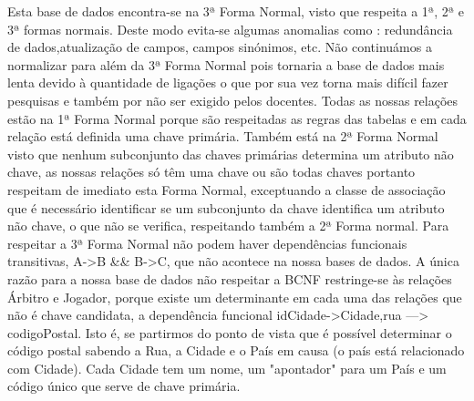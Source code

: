 \documentclass[a4paper]{article}
\begin{document}
Esta base de dados encontra-se na 3ª Forma Normal, visto que respeita a 1ª, 2ª e 3ª formas normais. Deste modo evita-se algumas anomalias como : redundância de dados,atualização de campos, campos sinónimos, etc. Não continuámos a normalizar para além da 3ª Forma Normal pois tornaria a base de dados mais lenta devido à quantidade de ligações o que por sua vez torna mais difícil fazer pesquisas e também por não ser exigido pelos docentes. Todas as nossas relações estão na 1ª Forma Normal porque são respeitadas as regras das tabelas e em cada relação está definida uma chave primária. Também está na 2ª Forma Normal visto que nenhum subconjunto das chaves primárias determina um atributo não chave, as nossas relações só têm uma chave ou são todas chaves portanto respeitam de imediato esta Forma Normal, exceptuando a classe de associação que é necessário identificar se um subconjunto da chave identifica um atributo não chave, o que não se verifica, respeitando também a 2ª Forma normal. Para respeitar a 3ª Forma Normal não podem haver dependências funcionais transitivas, A->B \&\& B->C, que não acontece na nossa bases de dados. A única razão para a nossa base de dados não respeitar a BCNF restringe-se às relações Árbitro e Jogador, porque existe um determinante em cada uma das relações que não é chave candidata, a dependência funcional idCidade->Cidade,rua ---> codigoPostal. Isto é, se partirmos do ponto de vista que é possível determinar o código postal sabendo a Rua, a Cidade e o País em causa (o país está relacionado com Cidade). Cada Cidade tem um nome, um "apontador" para um País e um código único que serve de chave primária.

\end{document}
